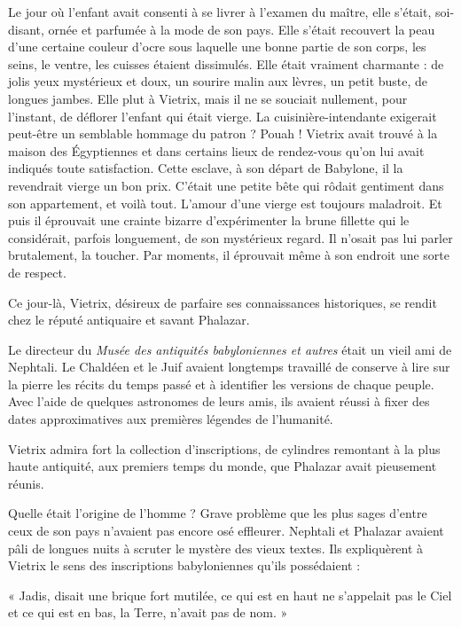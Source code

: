 \documentclass[a4paper, 11pt, oneside, polutonikogreek, french]{article}
\begin{document}
Le jour où l'enfant avait consenti à se livrer à l'examen du maître, elle s'était, soi-disant, ornée et parfumée à la mode de son pays. Elle s'était recouvert la peau d'une certaine couleur d'ocre sous laquelle une bonne partie de son corps, les seins, le ventre, les cuisses étaient dissimulés. Elle était vraiment charmante : de jolis yeux mystérieux et doux, un sourire malin aux lèvres, un petit buste, de longues jambes. Elle plut à Vietrix, mais il ne se souciait nullement, pour l'instant, de déflorer l'enfant qui était vierge. La cuisinière-intendante exigerait peut-être un semblable hommage du patron ? Pouah ! Vietrix avait trouvé à la maison des Égyptiennes et dans certains lieux de rendez-vous qu'on lui avait indiqués toute satisfaction. Cette esclave, à son départ de Babylone, il la revendrait vierge un bon prix. C'était une petite bête qui rôdait gentiment dans son appartement, et voilà tout. L'amour d'une vierge est toujours maladroit. Et puis il éprouvait une crainte bizarre d'expérimenter la brune fillette qui le considérait, parfois longuement, de son mystérieux regard. Il n'osait pas lui parler brutalement, la toucher. Par moments, il éprouvait même à son endroit une sorte de respect.

Ce jour-là, Vietrix, désireux de parfaire ses connaissances historiques, se rendit chez le réputé antiquaire et savant Phalazar.

\bigskip
\centerline{\EightStarTaper}
\centerline{\EightStarTaper\EightStarTaper}
\bigskip

Le directeur du \emph{Musée des antiquités babyloniennes et autres} était un vieil ami de Nephtali. Le Chaldéen et le Juif avaient longtemps travaillé de conserve à lire sur la pierre les récits du temps passé et à identifier les versions de chaque peuple. Avec l'aide de quelques astronomes de leurs amis, ils avaient réussi à fixer des dates approximatives aux premières légendes de l'humanité.

Vietrix admira fort la collection d'inscriptions, de cylindres remontant à la plus haute antiquité, aux premiers temps du monde, que Phalazar avait pieusement réunis.

Quelle était l'origine de l'homme ? Grave problème que les plus sages d'entre ceux de son pays n'avaient pas encore osé effleurer. Nephtali et Phalazar avaient pâli de longues nuits à scruter le mystère des vieux textes. Ils expliquèrent à Vietrix le sens des inscriptions babyloniennes qu'ils possédaient :

« Jadis, disait une brique fort mutilée, ce qui est en haut ne s'appelait pas le Ciel et ce qui est en bas, la Terre, n'avait pas de nom. »
\end{document}
